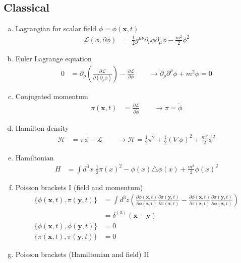 \documentclass[10pt,a4paper]{report}
\theoremstyle{definition}
\begin{document}
\subsection{Classical}
\begin{enumerate}[a)]
\item Lagrangian for scalar field $\phi=\phi(\mathbf{x},t)$
\begin{align}
\mathcal{L}(\phi,\partial\phi)&=\frac{1}{2}g^{\mu\nu}\partial_\nu\phi\partial_\mu\phi-\frac{m^2}{2}\phi^2
\end{align}
\item Euler Lagrange equation
\begin{align}
0&=\partial_\rho\left(\frac{\partial\mathcal{L}}{\partial(\partial_\rho\phi)}\right)-\frac{\partial\mathcal{L}}{\partial\phi}\qquad\rightarrow \partial_\rho\partial^\rho\phi+m^2\phi=0
\end{align}
\item Conjugated momentum
\begin{align}
\pi(\mathbf{x},t)&=\frac{\partial\mathcal{L}}{\partial\dot{\phi}}\qquad\rightarrow \pi=\dot{\phi}
\end{align}
\item Hamilton density
\begin{align}
\mathcal{H}&=\pi\dot{\phi}-\mathcal{L}\qquad\rightarrow\mathcal{H}=\frac{1}{2}\pi^2+\frac{1}{2}(\nabla\phi)^2+\frac{m^2}{2}\phi^2
\end{align}
\item Hamiltonian
\begin{align}
H&=\int d^3x\;\frac{1}{2}\pi(x)^2-\phi(x)\triangle\phi(x)+\frac{m^2}{2}\phi(x)^2
\end{align}
\item Poisson brackets I (field and momentum)
\begin{align}
\{\phi(\mathbf{x},t),\pi(\mathbf{y},t)\}
&=\int d^3z\left(\frac{\partial\phi(\mathbf{x},t)}{\partial\phi(\mathbf{z},t)}\frac{\partial \pi(\mathbf{y},t)}{\partial\pi(\mathbf{z},t)}-\frac{\partial\phi(\mathbf{x},t)}{\partial\pi(\mathbf{z},t)}\frac{\partial \pi(\mathbf{y},t)}{\partial\phi(\mathbf{z},t)}\right)\\
&=\delta^{(3)}(\mathbf{x}-\mathbf{y})\\
\{\phi(\mathbf{x},t),\phi(\mathbf{y},t)\}&=0\\
\{\pi(\mathbf{x},t),\pi(\mathbf{y},t)\}&=0
\end{align}
\item Poisson brackets (Hamiltonian and field) II
\begin{align}

\end{align}
\end{enumerate}
\end{document}
